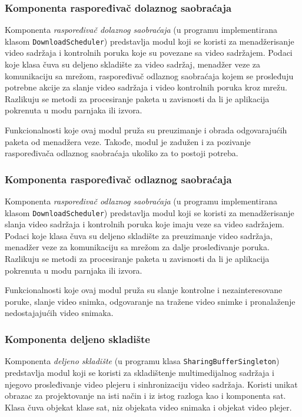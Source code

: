 \documentclass[12pt,oneside]{memoir}
\begin{document}
\subsubsection{Komponenta raspoređivač dolaznog saobraćaja}
\label{implementacija.2.3.5}

Komponenta \textit{raspoređivač dolaznog saobraćaja} (u programu implementirana klasom \texttt{DownloadScheduler}) predstavlja modul koji se koristi za menadžerisanje video sadržaja i kontrolnih poruka koje su povezane sa video sadržajem. Podaci koje klasa čuva su deljeno skladište za video sadržaj, menadžer veze za komunikaciju sa mrežom, raspoređivač odlaznog saobraćaja kojem se prosleđuju potrebne akcije za slanje video sadržaja i video kontrolnih poruka kroz mrežu. Razlikuju se metodi za procesiranje paketa u zavisnosti da li je aplikacija pokrenuta u modu parnjaka ili izvora.

Funkcionalnosti koje ovaj modul pruža su preuzimanje i obrada odgovarajućih paketa od menadžera veze. Takođe, modul je zadužen i za pozivanje raspoređivača odlaznog saobraćaja ukoliko za to postoji potreba.


\subsubsection{Komponenta raspoređivač odlaznog saobraćaja}
\label{implementacija.2.3.6}

Komponenta \textit{raspoređivač odlaznog saobraćaja} (u programu implementirana klasom \texttt{DownloadScheduler}) predstavlja modul koji se koristi za menadžerisanje slanja video sadržaja i kontrolnih poruka koje imaju veze sa video sadržajem. Podaci koje klasa čuva su deljeno skladište za preuzimanje video sadržaja, menadžer veze za komunikaciju sa mrežom za dalje prosleđivanje poruka. Razlikuju se metodi za procesiranje paketa u zavisnosti da li je aplikacija pokrenuta u modu parnjaka ili izvora.

Funkcionalnosti koje ovaj modul pruža su slanje kontrolne i nezainteresovane poruke, slanje video snimka, odgovaranje na tražene video snimke i pronalaženje nedostajajućih video snimaka.

\subsubsection{Komponenta deljeno skladište}
\label{implementacija.2.3.7}

Komponenta \textit{deljeno skladište} (u programu klasa \texttt{SharingBufferSingleton}) predstavlja modul koji se koristi za skladištenje multimedijalnog sadržaja i njegovo prosleđivanje video plejeru i sinhronizaciju video sadržaja. Koristi unikat obrazac za projektovanje na isti način i iz istog razloga kao i komponenta sat. Klasa čuva objekat klase sat, niz objekata video snimaka i objekat video plejer. 
\end{document}
